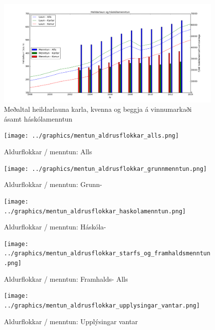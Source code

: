 \documentclass[12pt, git, final]{rureport}
\begin{document}
\begin{figure}
	\centering 
	\includegraphics[width=\textwidth]{graphics/heildar_laun_og_haskolamentun.png}
	\caption{Meðaltal heildarlauna karla, kvenna og beggja á vinnumarkaði ásamt háskólamenntun \label{fig:heildarhask}}
\end{figure}


\begin{figure}
	\centering 
	\texttt{[image: ../graphics/mentun\_aldrusflokkar\_alls.png]}
	\caption{Aldurflokkar / menntun: Alls \label{fig:menntunall}}
\end{figure}

\begin{figure}
	\centering 
	\texttt{[image: ../graphics/mentun\_aldrusflokkar\_grunnmenntun.png]}
	\caption{Aldurflokkar / menntun: Grunn- \label{fig:menntungrunn}}
\end{figure}

\begin{figure}
	\centering 
	\texttt{[image: ../graphics/mentun\_aldrusflokkar\_haskolamenntun.png]}
	\caption{Aldurflokkar / menntun: Háskóla- \label{fig:menntunhs}}
\end{figure}

\begin{figure}
	\centering 
	\texttt{[image: ../graphics/mentun\_aldrusflokkar\_starfs\_og\_framhaldsmenntun.png]}
	\caption{Aldurflokkar / menntun: Framhalds- Alls \label{fig:menntunfram}}
\end{figure}

\begin{figure}
	\centering 
	\texttt{[image: ../graphics/mentun\_aldrusflokkar\_upplysingar\_vantar.png]}
	\caption{Aldurflokkar / menntun: Upplýsingar vantar \label{fig:menntunvantar}}
\end{figure}
\end{document}
